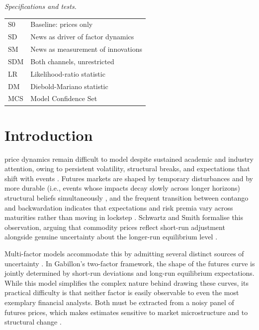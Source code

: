 \documentclass[journal]{IEEEtran}
\begin{document}
\smallskip
\noindent\textit{Specifications and tests.}

\smallskip
\begin{tabular}{@{}p{2.0cm}@{}p{5.95cm}@{}}
$\mathrm{S0}$      & Baseline: prices only \\
$\mathrm{SD}$      & News as driver of factor dynamics \\
$\mathrm{SM}$      & News as measurement of innovations \\
$\mathrm{SDM}$     & Both channels, unrestricted \\
LR                 & Likelihood-ratio statistic \\
DM                 & Diebold-Mariano statistic \\
MCS                & Model Confidence Set \\
\end{tabular}
\smallskip

\section{Introduction}

 price dynamics remain difficult to model despite sustained academic and industry attention, owing to persistent volatility, structural breaks, and expectations that shift with events \cite{Pan2024, Li2023, Du2025}. Futures markets are shaped by temporary disturbances and by more durable (i.e., events whose impacts decay slowly across longer horizons) structural beliefs simultaneously \cite{He2024}, and the frequent transition between contango and backwardation indicates that expectations and risk premia vary across maturities rather than moving in lockstep \cite{Gorton2013, Cortazar2022}. Schwartz and Smith formalise this observation, arguing that commodity prices reflect short-run adjustment alongside genuine uncertainty about the longer-run equilibrium level \cite{SchwartzSmith2000, Lee2023}.

Multi-factor models accommodate this by admitting several distinct sources of uncertainty \cite{Pindyck1999, Ballestra2025}. In Gabillon's \cite{Gabillon1992} two-factor framework, the shape of the futures curve is jointly determined by short-run deviations and long-run equilibrium expectations. While this model simplifies the complex nature behind drawing these curves, its practical difficulty is that neither factor is easily observable to even the most exemplary financial analysts. Both must be extracted from a noisy panel of futures prices, which makes estimates sensitive to market microstructure and to structural change \cite{SchwartzSmith2000, Peters2011}.
\end{document}
